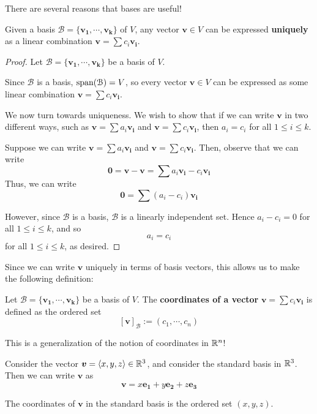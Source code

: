     There are several reasons that bases are useful!  
    
    \begin{theorem}\label{thm:basisunique}
    Given a basis $\mathscr{B} = \{\bm{v_1}, \cdots, \bm{v_k}\}$ of $V$, any vector $\bm{v} \in V$ can be expressed \textbf{uniquely} as a linear combination $\bm{v} = \sum c_i \bm{v_i}$.
    \end{theorem}

    \begin{proof}
    Let $\mathscr{B} = \{\bm{v_1}, \cdots, \bm{v_k}\}$ be a basis of $V$.  
    
    Since $\mathcal{B}$ is a basis, $\textnormal{span}(\mathcal{B}) = V$, so every vector $\bm{v} \in V$ can be expressed as some linear combination $\bm{v} = \sum c_i \bm{v_i}$.

    We now turn towards uniqueness.  We wish to show that if we can write $\bm{v}$ in two different ways, such as $\bm{v} = \sum a_i \bm{v_i}$ and $\bm{v} = \sum c_i \bm{v_i}$, then $a_i= c_i$ for all $1 \leq i \leq k$.

    Suppose we can write $\bm{v} = \sum a_i \bm{v_i}$ and $\bm{v} = \sum c_i \bm{v_i}$.  Then, observe that we can write $$\bm{0} = \bm{v} - \bm{v} = \sum a_i \bm{v_i} - c_i \bm{v_i}$$
    Thus, we can write $$\bm{0} = \sum (a_i - c_i) \bm{v_i} $$

    However, since $\mathcal{B}$ is a basis, $\mathcal{B}$ is a linearly independent set.  Hence $a_i - c_i = 0$ for all $1 \leq i \leq k$, and so $$a_i = c_i$$ for all $1 \leq i \leq k$, as desired.
    
    \end{proof}

    Since we can write $\bm{v}$ uniquely in terms of basis vectors, this allows us to make the following definition:
    
    \begin{definition}\label{coordinates}
    Let $\mathscr{B} = \{\bm{v_1}, \cdots, \bm{v_k}\}$ be a basis of $V$.  The \textbf{coordinates of a vector} $\bm{v} = \sum c_i \bm{v_i}$ is defined as the ordered set
    $$[\bm{v}]_\mathscr{B} := (c_1, \cdots, c_n)$$
    \end{definition}

    This is a generalization of the notion of coordinates in $\mathbb{R}^n$!

    \begin{example}
    Consider the vector $\bm{v} = \langle x, y,z \rangle \in \mathbb{R}^3$, and consider the standard basis in $\mathbb{R}^3$.  Then we can write $\bm{v}$ as
    $$\bm{v} = x\bm{e_1} + y\bm{e_2} + z\bm{e_3}$$
    
    The coordinates of $\bm{v}$ in the standard basis is the ordered set $(x,y,z)$.
    \end{example}
    
